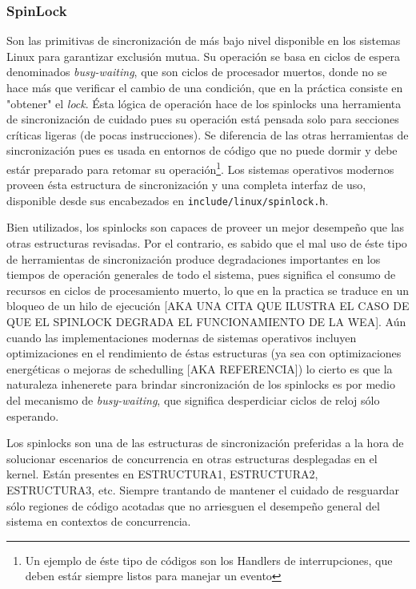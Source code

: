 \subsubsection{SpinLock}
Son las primitivas de sincronización de más bajo nivel disponible en los sistemas Linux para garantizar exclusión mutua. Su operación se basa en ciclos de espera denominados \emph{busy-waiting}, que son ciclos de procesador muertos, donde no se hace más que verificar el cambio de una condición, que en la práctica consiste en "obtener" el \emph{lock}. Ésta lógica de operación hace de los spinlocks una herramienta de sincronización de cuidado pues su operación está pensada solo para secciones críticas ligeras (de pocas instrucciones). Se diferencia de las otras herramientas de sincronización pues es usada en entornos de código que no puede dormir y debe estár preparado para retomar su operación\footnote{Un ejemplo de éste tipo de códigos son los Handlers de interrupciones, que deben estár siempre listos para manejar un evento}. Los sistemas operativos modernos proveen ésta estructura de sincronización y una completa interfaz de uso, disponible desde sus encabezados en \verb=include/linux/spinlock.h=.

Bien utilizados, los spinlocks son capaces de proveer un mejor desempeño que las otras estructuras revisadas. Por el contrario, es sabido que el mal uso de éste tipo de herramientas de sincronización produce degradaciones importantes en los tiempos de operación generales de todo el sistema, pues significa el consumo de recursos en ciclos de procesamiento muerto, lo que en la practica se traduce en un bloqueo de un hilo de ejecución [AKA UNA CITA QUE ILUSTRA EL CASO DE QUE EL SPINLOCK DEGRADA EL FUNCIONAMIENTO DE LA WEA]. Aún cuando las implementaciones modernas de sistemas operativos incluyen optimizaciones en el rendimiento de éstas estructuras (ya sea con optimizaciones energéticas o mejoras de schedulling [AKA REFERENCIA]) lo cierto es que la naturaleza inhenerete para brindar sincronización de los spinlocks es por medio del mecanismo de \emph{busy-waiting}, que significa desperdiciar ciclos de reloj sólo esperando.

Los spinlocks son una de las estructuras de sincronización preferidas a la hora de solucionar escenarios de concurrencia en otras estructuras desplegadas en el kernel. Están presentes en ESTRUCTURA1, ESTRUCTURA2, ESTRUCTURA3, etc. Siempre trantando de mantener el cuidado de resguardar sólo regiones de código acotadas que no arriesguen el desempeño general del sistema en contextos de concurrencia.

